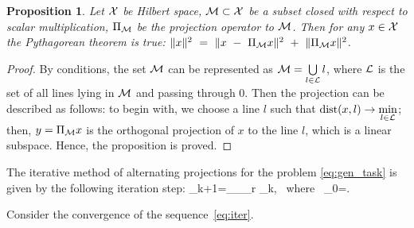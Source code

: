 \documentclass[sii]{ipart}
\newtheorem{proposition}{Proposition}
\begin{document}
\begin{proposition} \label{pythaprop}
	Let $\mathcal{X}$ be Hilbert space, $\mathcal{M} \subset \mathcal{X}$ be a subset closed with respect to scalar multiplication, $\Pi_{\mathcal{M}}$ be the projection operator to $\mathcal{M}$. Then for any $x \in \mathcal{X}$ the Pythagorean theorem is true: $\|x\|^2~=~\|x~-~\Pi_{\mathcal{M}} x\|^2~+~\|\Pi_{\mathcal{M}} x\|^2$.
\end{proposition}
\begin{proof}
	By conditions, the set $\mathcal{M}$ can be represented as $\mathcal{M} = \bigcup\limits_{l \in \mathcal{L}}l$, where $\mathcal{L}$ is the set of all lines lying in $\mathcal{M}$ and passing through $0$. Then the projection can be described as follows: to begin with, we choose a line $l$ such that $\mathop{\mathrm{dist}}(x, l) \rightarrow \min\limits_{l \in \mathcal{L}}$; then, $y = \Pi_{\mathcal{M}} x$ is the orthogonal projection of $x$ to the line $l$, which is a linear subspace. Hence, the proposition is proved.
\end{proof}

The iterative method of alternating projections for the problem \eqref{eq:gen_task} is given by the following iteration step:
\be
\label{eq:iter}
\bfY_{k+1}=\Pi_\calH \Pi_{\calM_r} \bfY_{k}, \mbox{\ where\ } \bfY_{0}=\bfX.
\ee

Consider the convergence of the sequence~\eqref{eq:iter}.
\end{document}
